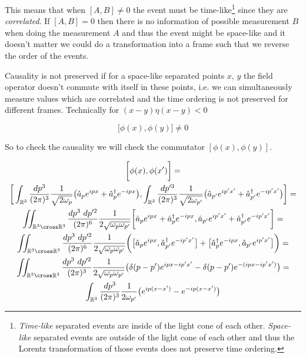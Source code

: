 This means that when $[A, B] \neq 0$ the event must be time-like\footnote{
\textit{Time-like} separated events are inside of the light cone of each other.
\textit{Space-like} separated events are outside of the light cone of each other and thus the Lorentz transformation of those 
events does not preserve time ordering.} since they are \textit{correlated}. If $[A, B] = 0$ then there is no information of possible
measurement $B$ when doing the measurement $A$ and thus the event might be space-like and it doesn't matter we could do a transformation
into a frame such that we reverse the order of the events.

\begin{definition}
    \label{df:causality_field_theory}
    Causality is not preserved if for a space-like separated points $x$, $y$ the field operator doesn't commute with itself in these points, i.e.
    we can simultaneously measure values which are correlated and the time ordering is not preserved for different frames. Technically for
    $(x - y) \eta (x - y) < 0$

    \begin{equation}
        \big[\phi(x), \phi(y)\big] \neq 0
    \end{equation}

\end{definition}

So to check the causality we will check the commutator $[\phi(x), \phi(y)]$.

\begin{equation*}
    \begin{gathered}
        \bigg[\phi(x), \phi(x')\bigg] = \\
        \bigg[
            \int_{\mathbb{R}^{3}} \frac{dp^{3}}{(2 \pi)^{3}} \frac{1}{\sqrt{2 \omega_{p}}} \big(\hat{a}_{p} e^{ipx} + \hat{a}^{\dagger}_{p} e^{-ipx}\big),
            \int_{\mathbb{R}^{3}} \frac{dp'^{3}}{(2 \pi)^{3}} \frac{1}{\sqrt{2 \omega_{p'}}} \big(\hat{a}_{p'} e^{ip'x'} + \hat{a}^{\dagger}_{p'} e^{-ip'x'}\big)
        \bigg] = \\
        \iint_{\mathbb{R}^{3} \cross \mathbb{R}^{3}} \frac{dp^{3} \ dp'^{2}}{(2 \pi)^{6}} \frac{1}{2 \sqrt{\omega_{p} \omega_{p'}}}
        \bigg[
            \hat{a}_{p} e^{ipx} + \hat{a}^{\dagger}_{p} e^{-ipx},
            \hat{a}_{p'} e^{ip'x'} + \hat{a}^{\dagger}_{p'} e^{-ip'x'}
        \bigg] = \\
        \iint_{\mathbb{R}^{3} \cross \mathbb{R}^{3}} \frac{dp^{3} \ dp'^{2}}{(2 \pi)^{6}} \frac{1}{2 \sqrt{\omega_{p} \omega_{p'}}}
        \bigg(
            \big[\hat{a}_{p} e^{ipx}, \hat{a}^{\dagger}_{p'} e^{-ip'x'}\big] + \big[\hat{a}^{\dagger}_{p} e^{-ipx}, \hat{a}_{p'} e^{ip'x'}\big]
        \bigg) = \\
        \iint_{\mathbb{R}^{3} \cross \mathbb{R}^{3}} \frac{dp^{3} \ dp'^{2}}{(2 \pi)^{3}} \frac{1}{2 \sqrt{\omega_{p} \omega_{p'}}}
        \big(\delta(p - p') e^{ipx - ip'x'} - \delta(p - p') e^{-(ipx - ip'x')} \big) = \\
        \int_{\mathbb{R}^{3}} \frac{dp^{3}}{(2 \pi)^{3}} \frac{1}{2 \omega_{p'}} \big(e^{ip(x - x')} - e^{-ip(x - x')} \big)
    \end{gathered}
\end{equation*}

